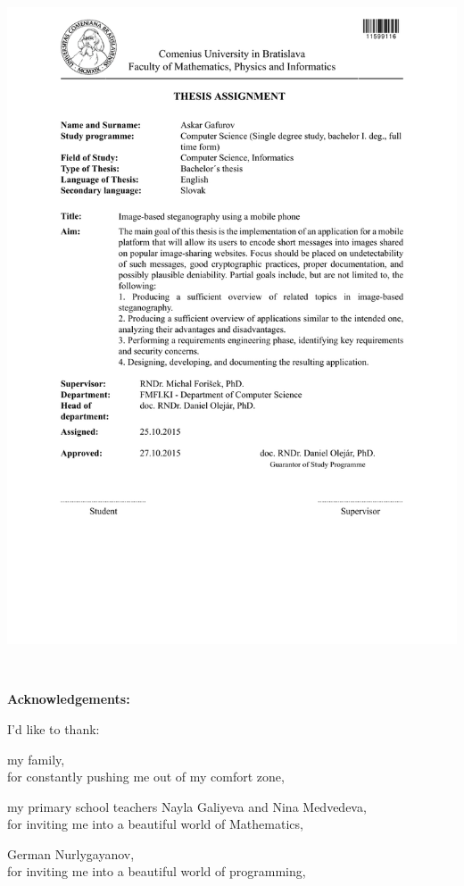 \documentclass[12pt, oneside]{book}
\def\ack#1#2{#1,\\#2\smallskip}
\begin{document}
\newpage 
\thispagestyle{empty}
\hspace{-2cm}\includegraphics[width=1.1\textwidth]{images/zadanie_en}



\frontmatter

\setcounter{page}{3}
\newpage 
~

\vfill
{\bf Acknowledgements:} 

I'd like to thank:

\ack{my family}{for constantly pushing me out of my comfort zone,}

\ack{my primary school teachers Nayla Galiyeva and Nina Medvedeva}{for inviting me into 
a beautiful world of Mathematics,}

\ack{German Nurlygayanov}{for inviting me into a beautiful world of programming,}
\end{document}
